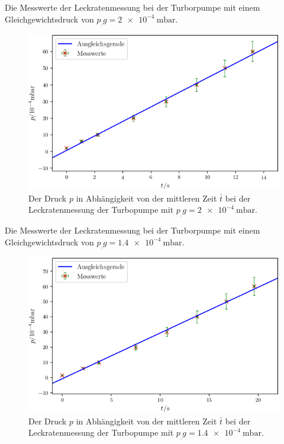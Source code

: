 \newpage
\begin{table}
\centering
\caption{Die Messwerte der Leckratenmessung bei der Turborpumpe mit einem Gleichgewichtsdruck von $p_.g = \SI{2e-4}{\milli\bar}$.}

\label{tab:TL1}
\end{table}

\begin{figure}
\centering
\includegraphics[width=\linewidth-70pt,height=\textheight-70pt,keepaspectratio]{content/images/TL1.png}
\caption{Der Druck $p$ in Abhängigkeit von der mittleren Zeit $\bar{t}$ bei der Leckratenmessung der Turbopumpe  mit $p_.g = \SI{2e-4}{\milli\bar}$.}
\label{fig:TL1}
\end{figure}

\newpage
\begin{table}
\centering
\caption{Die Messwerte der Leckratenmessung bei der Turborpumpe mit einem Gleichgewichtsdruck von $p_.g = \SI{1.4e-4}{\milli\bar}$.}

\label{tab:TL2}
\end{table}

\begin{figure}
\centering
\includegraphics[width=\linewidth-70pt,height=\textheight-70pt,keepaspectratio]{content/images/TL2.png}
\caption{Der Druck $p$ in Abhängigkeit von der mittleren Zeit $\bar{t}$ bei der Leckratenmessung der Turbopumpe  mit $p_.g = \SI{1.4e-4}{\milli\bar}$.}
\label{fig:TL2}
\end{figure}


